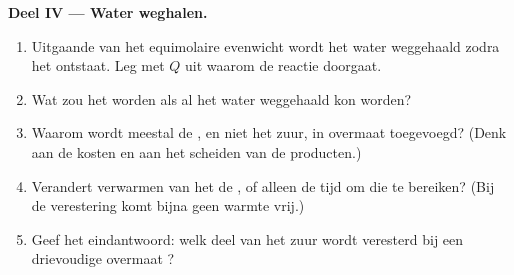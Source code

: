 \begin{problem}
\medskip
\noindent\textbf{Deel IV --- Water weghalen.}
\begin{enumerate}[resume]
  \item Uitgaande van het equimolaire evenwicht wordt het water
        weggehaald zodra het ontstaat. Leg met $Q$ uit waarom de reactie
        doorgaat.
  \item Wat zou het  worden als al het water weggehaald kon
        worden?
  \item Waarom wordt meestal de , en niet het zuur, in overmaat
        toegevoegd? (Denk aan de kosten en aan het scheiden van de
        producten.)
  \item Verandert verwarmen van het  de , of alleen de
        tijd om die te bereiken? (Bij de verestering komt bijna geen
        warmte vrij.)
  \item Geef het eindantwoord: welk deel van het zuur wordt veresterd bij
        een drievoudige overmaat ?
\end{enumerate}
\end{problem}
